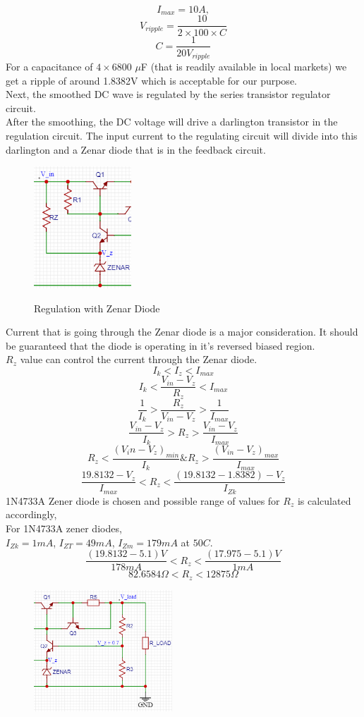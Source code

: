 \documentclass[11pt]{article}
\begin{document}
\begin{multicols}{2}
$$I_{max}=10A,$$
$$V_{ripple} = \frac{10}{2 \times 100 \times C}$$
$$C=\frac{1}{20V_{ripple}}$$
For a capacitance of $ 4 \times 6800 $ $\mu $F (that is readily available in local markets) we get a ripple of around 1.8382V which is acceptable for our purpose.\\
Next, the smoothed DC wave is regulated by the series transistor regulator circuit. \\
After the smoothing, the DC voltage will drive a darlington transistor in the regulation circuit. The input current to the regulating circuit will divide into this darlington and a Zenar diode that is in the feedback circuit.
\begin{figure}[H]
   \centering
   \includegraphics[height=1.8in]{Zenar.png}\\
   \caption{Regulation with Zenar Diode}
\end{figure}
Current that is going through the Zenar diode is a major consideration. It should be guaranteed that the diode is operating in it's reversed biased region.\\
$R_z$ value can control the current through the Zenar diode.\\
$$I_k < I_z < I_{max}$$
$$I_k < \frac{V_{in} - V_z}{R_z} < I_{max}$$
$$\frac{1}{I_k} > \frac{R_z}{V_{in}-V_z} > \frac{1}{I_{max}}$$
$$\frac{V_{in}-V_z}{I_k} > R_z > \frac{V_{in}-V_z}{I_{max}}$$
$$ R_z < \frac{(V_in - V_z)_{min}}{I_k} \&  R_z > \frac{(V_{in}-V_z)_{max}}{I_{max}}$$
$$\frac{19.8132 - V_z}{I_{max}} < R_z < \frac{(19.8132 - 1.8382) - V_z}{I_{Zk}}$$
\newline
1N4733A Zener diode is chosen and possible range of values for $R_z$ is calculated accordingly,\\
For 1N4733A zener diodes,\\
$I_{Zk} =1mA$, $I_{ZT} = 49mA$, $I_{Zm} = 179mA$ at $50$\textdegree $C.$
$$ \frac{(19.8132 - 5.1) V}{178mA} < R_z < \frac{(17.975-5.1)V}{1mA}$$
$$82.6584\Omega < R_z < 12875\Omega$$
\begin{figure}[H]
   \centering
   \includegraphics[height=1.8in]{Voltage Divider.png}\\

\end{figure}
\end{multicols}
\end{document}
